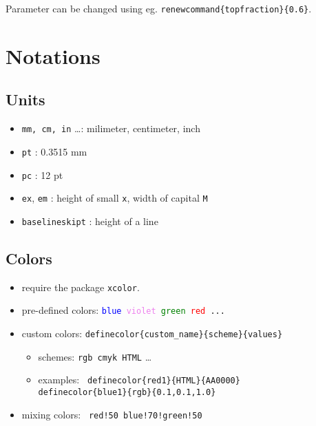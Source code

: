         Parameter can be changed using eg. \texttt{\bs renewcommand\{\bs topfraction\}\{0.6\}}.

\section{Notations}

    \subsection{Units}
        \begin{itemize}
            \item \texttt{mm, cm, in} \dots : milimeter, centimeter, inch
            \item \texttt{pt} : 0.3515 mm
            \item \texttt{pc} : 12 pt
            \item \texttt{ex}, \texttt{em} : height of small \texttt{x}, width of capital \texttt{M}
            \item \texttt{\bs baselineskipt} : height of a line
        \end{itemize}

    \subsection{Colors}
        \label{subsec:notations_colors}
        \begin{itemize}
            \item require the package \texttt{xcolor}.
            \item pre-defined colors: \texttt{\textcolor{blue}{blue} \textcolor{violet}{violet} \textcolor{green}{green} \textcolor{red}{red} ...}
            \item custom colors: \texttt{\bs definecolor\{custom\_name\}\{scheme\}\{values\} }
                \begin{itemize}
                    \item schemes: \texttt{rgb cmyk HTML} \dots
                     
                    \item examples: \texttt{ \textcolor{red1}{\bs definecolor\{red1\}\{HTML\}\{AA0000\}} \\
                        \phantom{examples: } \textcolor{blue1}{\bs definecolor\{blue1\}\{rgb\}\{0.1,0.1,1.0\}} }
                \end{itemize}
            \item mixing colors: \texttt{ \textcolor{red!50}{red!50} \textcolor{blue!70!green!50}{blue!70!green!50} }
        \end{itemize}

